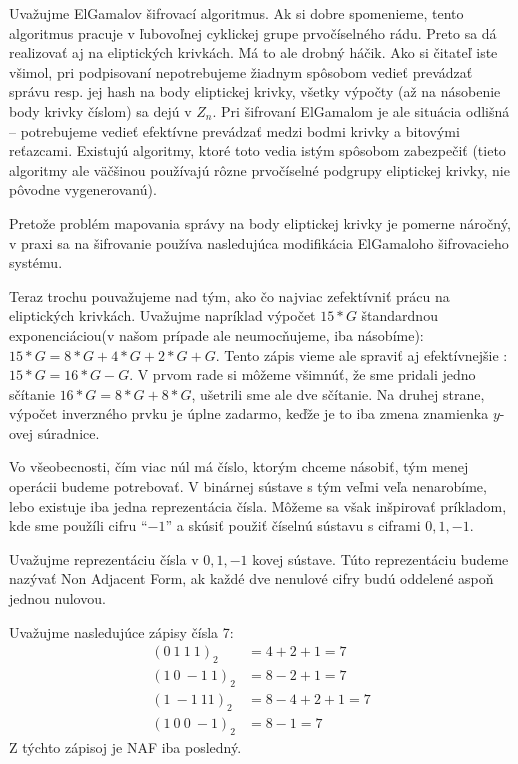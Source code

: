 \begin{poznamka}
    Uvažujme ElGamalov šifrovací algoritmus. Ak si dobre spomenieme,
    tento algoritmus pracuje v ľubovoľnej cyklickej grupe
    prvočíselného rádu. Preto sa dá realizovať aj na eliptických
    krivkách. Má to ale drobný háčik.
    Ako si čitateľ iste všimol, pri podpisovaní nepotrebujeme
    žiadnym spôsobom vedieť prevádzať správu resp. jej hash na body
    eliptickej krivky, všetky výpočty (až na násobenie body krivky
    číslom) sa dejú v $Z_n$. Pri šifrovaní ElGamalom 
    je ale situácia odlišná -- potrebujeme vedieť efektívne prevádzať
    medzi bodmi krivky a bitovými reťazcami. Existujú algoritmy, ktoré
    toto vedia istým spôsobom zabezpečiť (tieto algoritmy ale väčšinou
    používajú rôzne prvočíselné podgrupy eliptickej krivky, nie
    pôvodne vygenerovanú).
\end{poznamka}

Pretože problém mapovania správy na body eliptickej krivky je pomerne
náročný, v praxi sa na šifrovanie používa nasledujúca modifikácia
ElGamaloho šifrovacieho systému.


Teraz trochu pouvažujeme nad tým, ako čo najviac zefektívniť prácu na
eliptických krivkách. Uvažujme napríklad výpočet $15*G$ štandardnou
exponenciáciou(v našom prípade ale neumocňujeme, iba násobíme):
$15*G = 8*G + 4*G + 2*G + G$. Tento zápis vieme ale spraviť aj
efektívnejšie : $15*G = 16*G - G$. V prvom rade si môžeme všimnúť, že
sme pridali jedno sčítanie $16*G = 8*G + 8*G$, ušetrili sme ale dve
sčítanie. Na druhej strane, výpočet inverzného prvku je úplne zadarmo,
keďže je to iba zmena znamienka $y$-ovej súradnice.

Vo všeobecnosti, čím viac núl má číslo, ktorým chceme
násobiť, tým menej operácii budeme potrebovať. V binárnej sústave s
tým veľmi veľa nenarobíme, lebo existuje iba jedna reprezentácia
čísla. Môžeme sa však inšpirovať príkladom, kde sme použíli cifru
``$-1$'' a skúsiť použiť číselnú sústavu s ciframi $0,1,-1$.

\begin{definicia}
    Uvažujme reprezentáciu čísla v $0,1,-1$ kovej sústave.
    Túto reprezentáciu budeme nazývať Non Adjacent Form, ak každé dve
    nenulové cifry budú oddelené aspoň jednou nulovou.
\end{definicia}

\begin{priklad}
    Uvažujme nasledujúce zápisy čísla 7:
    \begin{align*}
        (0\ 1\ 1\ 1)_2 &= 4+2+1=7 \\
        (1\ 0\ -1\ 1)_2 &= 8-2+1=7 \\
        (1\ -1\ 1 1)_2 &= 8-4+2+1=7 \\
        (1\ 0\ 0\ -1)_2 &= 8-1=7
    \end{align*}
    Z týchto zápisoj je NAF iba posledný.
\end{priklad}

